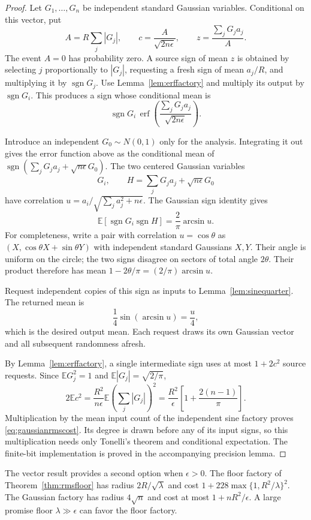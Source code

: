 \begin{proof}
Let $G_1,\ldots,G_n$ be independent standard Gaussian variables.
Conditional on this vector, put
\[
 A=R\sum_j|G_j|,\qquad
 c=\frac{A}{\sqrt{2n\epsilon}},\qquad
 z=\frac{\sum_jG_ja_j}{A}.
\]
The event $A=0$ has probability zero. A source sign of mean $z$ is
obtained by selecting $j$ proportionally to $|G_j|$, requesting a
fresh sign of mean $a_j/R$, and multiplying it by $\operatorname{sgn}G_j$.
Use Lemma~\ref{lem:erffactory} and multiply its output by
$\operatorname{sgn}G_i$. This produces a sign whose conditional mean is
\[
 \operatorname{sgn}G_i\,
 \operatorname{erf}\left(\frac{\sum_jG_ja_j}{\sqrt{2n\epsilon}}\right).
\]

Introduce an independent $G_0\sim N(0,1)$ only for the analysis.
Integrating it out gives the error function above as the conditional
mean of
$\operatorname{sgn}(\sum_jG_ja_j+\sqrt{n\epsilon}G_0)$.
The two centered Gaussian variables
\[
 G_i,\qquad H=\sum_jG_ja_j+\sqrt{n\epsilon}G_0
\]
have correlation
$u=a_i/\sqrt{\sum_j a_j^2+n\epsilon}$.
The Gaussian sign identity gives
\[
 \mathbb E[\operatorname{sgn}G_i\operatorname{sgn}H]
 =\frac2\pi\arcsin u.
\]
For completeness, write a pair with correlation $u=\cos\theta$ as
$(X,\cos\theta X+\sin\theta Y)$ with independent standard Gaussians
$X,Y$. Their angle is uniform on the circle; the two signs disagree
on sectors of total angle $2\theta$. Their product therefore has
mean $1-2\theta/\pi=(2/\pi)\arcsin u$.

Request independent copies of this sign as inputs to
Lemma~\ref{lem:sinequarter}. The returned mean is
\[
 \frac14\sin(\arcsin u)=\frac u4,
\]
which is the desired output mean.
Each request draws its own Gaussian vector and all subsequent
randomness afresh.

By Lemma~\ref{lem:erffactory}, a single intermediate sign uses at
most $1+2c^2$ source requests. Since
$\mathbb E G_j^2=1$ and $\mathbb E|G_j|=\sqrt{2/\pi}$,
\[
 2\mathbb E c^2
 =\frac{R^2}{n\epsilon}\mathbb E\left(\sum_j|G_j|\right)^2
 =\frac{R^2}{\epsilon}\left[1+\frac{2(n-1)}\pi\right].
\]
Multiplication by the mean input count of the independent sine
factory proves \eqref{eq:gaussianrmscost}. Its degree is drawn before
any of its input signs, so this multiplication needs only Tonelli's
theorem and conditional expectation. The finite-bit implementation
is proved in the accompanying precision lemma.
\end{proof}

The vector result provides a second option when $\epsilon>0$.
The floor factory of Theorem~\ref{thm:rmsfloor} has radius
$2R/\sqrt\lambda$ and cost $1+228\max\{1,R^2/\lambda\}^2$.
The Gaussian factory has radius $4\sqrt n$ and cost at most
$1+nR^2/\epsilon$. A large promise floor $\lambda\gg\epsilon$ can
favor the floor factory.

